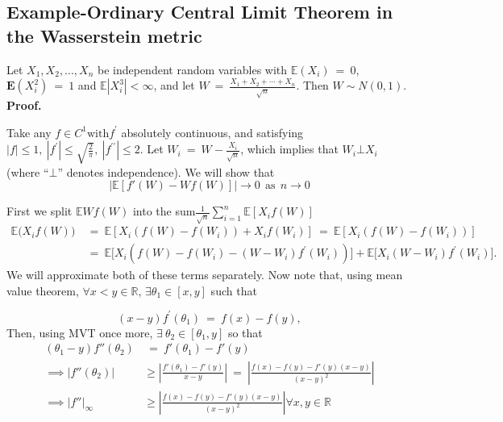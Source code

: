 \documentclass[12pt]{article}
\newcommand{\e}{\mathbb{E}}
\newcommand{\eq }{\: = \:}
\theoremstyle{nonumberplain}
\begin{document}
\medskip
\noindent
\subsection{Example-Ordinary Central Limit Theorem in the Wasserstein metric} 

Let $X_{1}, X_{2}, ... ,X_{n}$ be independent random variables with $\mathbb{E}(X_{i})\eq 0$, $\mathbf{E}(X_{i}^{2})\eq 1$ and $\mathbb{E}|X_{i}^{3}|<\infty$, and let $W\eq \frac{X_{1}+X_{2}+\cdots+X_{n}}{\sqrt{n}}$. Then $W\sim N(0,1)$. \\
\textbf{Proof.}

Take any $f\in C^{1} \mbox{with} f^{\prime}$ absolutely continuous, and satisfying $|f|\leq 1,\ |f^{\prime}|\leq \sqrt{\frac{2}{\pi}},\ |f^{\prime \prime}|\leq 2$. Let $W_{i}\eq W-\frac{X_{i}}{\sqrt{n}}$, which implies that $W_{i}\bot X_{i}$ (where ``$\bot$'' denotes independence). We will show that
$$
\left| \e \left[ f'(W) - Wf(W) \right] \right| \to 0 \:\: \text{as} \:\: n \to 0
$$

First we split $\e Wf(W)$ into  the sum$\frac{1}{\sqrt{n}} \sum_{i=1}^{n} \e \left[ X_i f(W) \right]$
\begin{align*}
\mathbb{E}\bigl(X_{i}f(W)\bigr)&\eq \mathbb{E}[X_{i}(f(W)-f(W_{i}))+X_{i}f(W_{i})]\eq \mathbb{E}[X_{i}(f(W)-f(W_{i}))]\\
&\eq  \mathbb{E}\bigl[X_{i}(f(W)-f(W_{i})-(W-W_{i})f^{\prime}(W_{i})) \bigr]+\mathbb{E}\bigl[X_{i}(W-W_{i})f^{\prime}(W_{i})  \bigr].
\end{align*}
We will approximate both of these terms separately. Now note that, using mean value theorem, $\forall x < y \in \mathbb{R}$, $\exists \theta_1 \in [x, y]$ such that 

$$
(x-y)f^{\prime}(\theta_1)\eq f(x) - f(y),
$$ 
Then, using MVT once more, $\exists \: \theta_2 \in [\theta_1, y]$
so that 
\begin{align*}
(\theta_1 - y)f''(\theta_2) &\eq f'(\theta_1) - f'(y) \\
\implies |f''(\theta_2)| &\ge \left| \frac{f'(\theta_1) - f'(y)}{x-y}\right| \eq \left| \frac{f(x) - f(y) - f'(y)(x-y)}{(x-y)^2} \right| \\
\implies |f''|_{\infty} &\ge \left| \frac{f(x) - f(y) - f'(y)(x-y)}{(x-y)^2} \right| \forall x, y \in \mathbb{R}
\end{align*}
\end{document}

